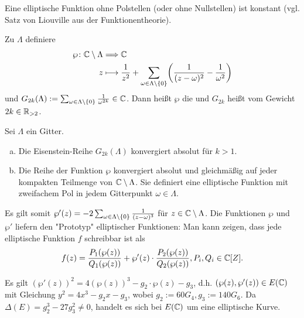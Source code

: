 Eine elliptische Funktion ohne Polstellen (oder ohne Nullstellen) ist konstant (vgl. Satz von Liouville aus der Funktionentheorie).

\begin{defn}
	Zu $\Lambda$ definiere
	\begin{equation}
	\begin{aligned}
		\wp \colon \CC \setminus \Lambda &\Longrightarrow \CC \\
		z &\longmapsto \frac{1}{z^2} + \sum_{\omega \in \Lambda \setminus \setnull} \enb{\frac{1}{(z-\omega)^2} - \frac{1}{\omega^2}}
	\end{aligned}
	\end{equation}
	und $G_{2k}(\Lambda) := \sum_{\omega \in \Lambda \setminus \{0\}} \frac{1}{\omega^{2k}} \in \mathbb{C}$. Dann heißt $\wp$ die  und $G_{2k}$ heißt  vom Gewicht $2k \in \mathbb{R}_{>2}$.
\end{defn}

\begin{satz}
	Sei $\Lambda$ ein Gitter.
	\begin{enumerate}[(a)]
		\item Die Eisenstein-Reihe $G_{2k}(\Lambda)$ konvergiert absolut für $k > 1$.
		\item Die Reihe der Funktion $\wp$ konvergiert absolut und gleichmäßig auf jeder kompakten Teilmenge von $\mathbb{C} \setminus \Lambda$.
		Sie definiert eine elliptische Funktion mit zweifachem Pol in jedem Gitterpunkt $\omega \in \Lambda$.
	\end{enumerate}
\end{satz}

Es gilt somit $\wp'(z) = -2 \sum_{\omega \in \Lambda \setminus \{0\}} \frac{1}{(z-\omega)^3}$ für $z \in \mathbb{C} \setminus \Lambda$. 
Die Funktionen $\wp$ und $\wp'$ liefern den "Prototyp" elliptischer Funktionen:
Man kann zeigen, dass jede elliptische Funktion $f$ schreibbar ist als
\[
	f(z) = \frac{P_1(\wp(z))}{Q_1(\wp(z))} + \wp'(z) \cdot \frac{P_2(\wp(z))}{Q_2(\wp(z))}, P_i, Q_i \in \mathbb{C}[Z].
\]

\begin{satz}
	Es gilt $(\wp'(z))^2 = 4(\wp(z))^3 - g_2 \cdot \wp(z) - g_3$, d.h. $(\wp(z),\wp'(z)) \in E(\mathbb{C})$ mit Gleichung $y^2 = 4x^3 - g_2 x - g_3$, wobei $g_2 := 60 G_4, g_3 := 140 G_6$.
	Da $\Delta(E) = g_2^3 - 27g_3^2 \neq 0$, handelt es sich bei $E(\mathbb{C})$ um eine elliptische Kurve.
\end{satz}

